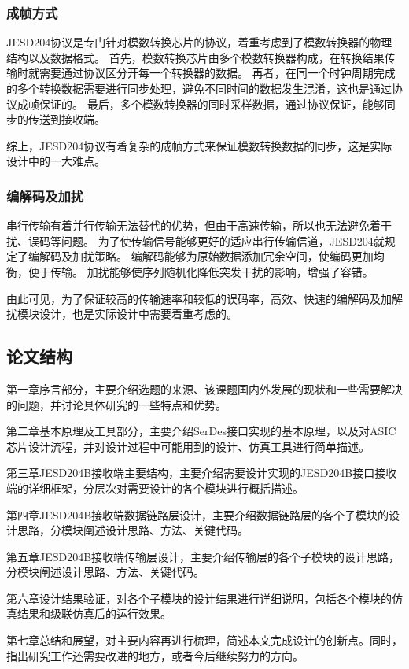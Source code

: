 \documentclass[UTF8]{ctexart}
\begin{document}
\subsubsection{成帧方式}

JESD204协议是专门针对模数转换芯片的协议，着重考虑到了模数转换器的物理结构以及数据格式。
首先，模数转换芯片由多个模数转换器构成，在转换结果传输时就需要通过协议区分开每一个转换器的数据。
再者，在同一个时钟周期完成的多个转换数据需要进行同步处理，避免不同时间的数据发生混淆，这也是通过协议成帧保证的。
最后，多个模数转换器的同时采样数据，通过协议保证，能够同步的传送到接收端。

综上，JESD204协议有着复杂的成帧方式来保证模数转换数据的同步，这是实际设计中的一大难点。

\subsubsection{编解码及加扰}

串行传输有着并行传输无法替代的优势，但由于高速传输，所以也无法避免着干扰、误码等问题。
为了使传输信号能够更好的适应串行传输信道，JESD204就规定了编解码及加扰策略。
编解码能够为原始数据添加冗余空间，使编码更加均衡，便于传输。
加扰能够使序列随机化降低突发干扰的影响，增强了容错。

由此可见，为了保证较高的传输速率和较低的误码率，高效、快速的编解码及加解扰模块设计，也是实际设计中需要着重考虑的。

\subsection{论文结构}

第一章序言部分，主要介绍选题的来源、该课题国内外发展的现状和一些需要解决的问题，并讨论具体研究的一些特点和优势。

第二章基本原理及工具部分，主要介绍SerDes接口实现的基本原理，以及对ASIC芯片设计流程，并对设计过程中可能用到的设计、仿真工具进行简单描述。

第三章JESD204B接收端主要结构，主要介绍需要设计实现的JESD204B接口接收端的详细框架，分层次对需要设计的各个模块进行概括描述。

第四章JESD204B接收端数据链路层设计，主要介绍数据链路层的各个子模块的设计思路，分模块阐述设计思路、方法、关键代码。

第五章JESD204B接收端传输层设计，主要介绍传输层的各个子模块的设计思路，分模块阐述设计思路、方法、关键代码。

第六章设计结果验证，对各个子模块的设计结果进行详细说明，包括各个模块的仿真结果和级联仿真后的运行效果。

第七章总结和展望，对主要内容再进行梳理，简述本文完成设计的创新点。同时，指出研究工作还需要改进的地方，或者今后继续努力的方向。


\end{document}
